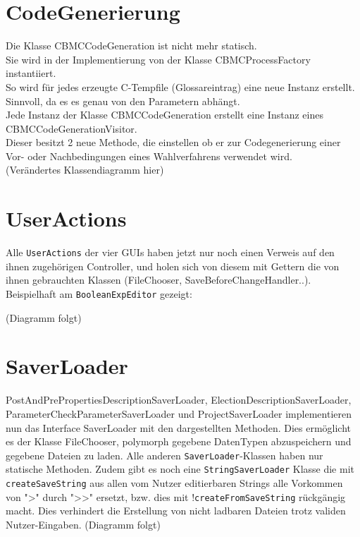 \documentclass[a4paper]{scrreprt}
\begin{document}
\section{CodeGenerierung}

Die Klasse CBMCCodeGeneration ist nicht mehr statisch. \\
Sie wird in der Implementierung von der Klasse CBMCProcessFactory instantiiert. \\
So wird für jedes erzeugte C-Tempfile (Glossareintrag) eine neue Instanz erstellt. Sinnvoll, da es es genau von den Parametern abhängt. \\
Jede Instanz der Klasse CBMCCodeGeneration erstellt eine Instanz eines CBMCCodeGenerationVisitor. \\
Dieser besitzt 2 neue Methode, die einstellen ob er zur Codegenerierung einer Vor- oder Nachbedingungen eines Wahlverfahrens verwendet wird.  \\
(Verändertes Klassendiagramm hier)

\section{UserActions}
Alle \verb!UserActions! der vier GUIs haben jetzt nur noch einen Verweis auf den ihnen zugehörigen Controller, und holen sich von diesem mit Gettern die von ihnen gebrauchten Klassen (FileChooser, SaveBeforeChangeHandler..). Beispielhaft am \verb!BooleanExpEditor! gezeigt:
\newline

(Diagramm folgt)
\newline

\section{SaverLoader}
PostAndPrePropertiesDescriptionSaverLoader, ElectionDescriptionSaverLoader, ParameterCheckParameterSaverLoader und ProjectSaverLoader implementieren nun das Interface SaverLoader mit den dargestellten Methoden. Dies ermöglicht es der Klasse FileChooser, polymorph gegebene DatenTypen abzuspeichern und gegebene Dateien zu laden.
Alle anderen \verb!SaverLoader!-Klassen haben nur statische Methoden.
Zudem gibt es noch eine \verb!StringSaverLoader! Klasse die mit \verb!createSaveString! aus allen vom Nutzer editierbaren Strings alle Vorkommen von ">" durch ">>" ersetzt, bzw. dies mit !\verb!createFromSaveString! rückgängig macht. Dies verhindert die Erstellung von nicht ladbaren Dateien trotz validen Nutzer-Eingaben.
\newline
(Diagramm folgt)
\newline
\end{document}
